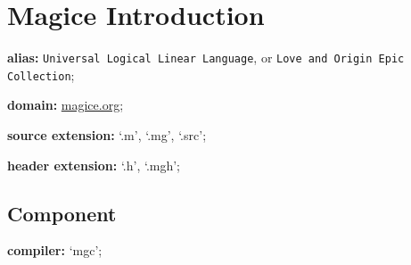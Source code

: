 \documentclass[UTF8]{book}
\begin{document}
	\author{dosconio}
	\section{Magice Introduction}
	
	\textbf{alias:} \texttt{Universal Logical Linear Language}, or
		\texttt{Love and Origin Epic Collection};
	
	\textbf{domain:} \href{http://magice.org}{magice.org};
	
	\textbf{source extension:} `.m', `.mg', `.src';
	
	\textbf{header extension:} `.h', `.mgh';
	
		\subsection{Component}
		
		\textbf{compiler:} `mgc';
	
\end{document}
